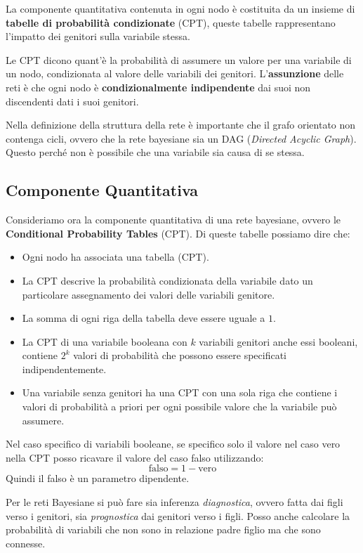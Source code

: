 La componente quantitativa contenuta in ogni nodo è costituita da un insieme di
\textbf{tabelle di probabilità condizionate} (CPT), queste tabelle rappresentano
l'impatto dei genitori sulla variabile stessa.

Le CPT dicono quant'è la probabilità di assumere un valore per una variabile di
un nodo, condizionata al valore delle variabili dei genitori. L'\textbf{assunzione}
delle reti è che ogni nodo è \textbf{condizionalmente indipendente} dai suoi non
discendenti dati i suoi genitori.

Nella definizione della struttura della rete è importante che il grafo orientato
non contenga cicli, ovvero che la rete bayesiane sia un DAG (\textit{Directed Acyclic
    Graph}). Questo perché non è possibile che una variabile sia causa di se stessa.
\subsection{Componente Quantitativa}
Consideriamo ora la componente quantitativa di una rete bayesiane, ovvero le
\textbf{Conditional Probability Tables} (CPT). Di queste tabelle possiamo dire che:
\begin{itemize}
    \item Ogni nodo ha associata una tabella (CPT).
    \item La CPT descrive la probabilità condizionata della variabile dato un
          particolare assegnamento dei valori delle variabili genitore.
    \item La somma di ogni riga della tabella deve essere uguale a $1$.
    \item La CPT di una variabile booleana con $k$ variabili genitori anche essi
          booleani, contiene $2^k$ valori di probabilità che possono essere
          specificati indipendentemente.
    \item Una variabile senza genitori ha una CPT con una sola riga che contiene
          i valori di probabilità a priori per ogni possibile valore che la
          variabile può assumere.
\end{itemize}
\begin{nota}
    Nel caso specifico di variabili booleane, se specifico solo il valore nel
    caso vero nella CPT posso ricavare il valore del caso falso utilizzando:
    \begin{equation*}
        \text{falso} = 1 - \text{vero}
    \end{equation*}
    Quindi il falso è un parametro dipendente.
\end{nota}
Per le reti Bayesiane si può fare sia inferenza \textit{diagnostica}, ovvero fatta
dai figli verso i genitori, sia \textit{prognostica} dai genitori verso i figli.
Posso anche calcolare la probabilità di variabili che non sono in relazione padre
figlio ma che sono connesse.
